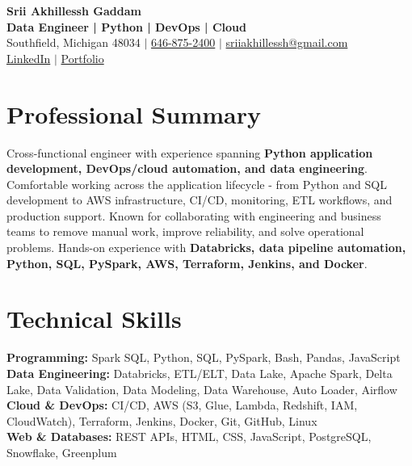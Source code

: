 \documentclass[letterpaper,10pt]{article}
\begin{document}
\fontsize{9.35pt}{10.45pt}\selectfont

\begin{center}
    {\LARGE \textbf{Srii Akhillessh Gaddam}} \\[-1pt]
    \textbf{Data Engineer | Python | DevOps | Cloud} \\[2pt]
    Southfield, Michigan 48034 $|$
    \href{tel:6468752400}{646-875-2400} $|$
    \href{mailto:sriiakhillessh@gmail.com}{sriiakhillessh@gmail.com} \\[1pt]
    \href{https://www.linkedin.com/in/srii-akhiilessh-gaddam-b48668191/}{LinkedIn} $|$
    \href{https://sriiakhillesshg.github.io/portfolio/}{Portfolio}
\end{center}
\vspace{-8pt}

\section{Professional Summary}
\small{Cross-functional engineer with experience spanning \textbf{Python application development, DevOps/cloud automation, and data engineering}. Comfortable working across the application lifecycle - from Python and SQL development to AWS infrastructure, CI/CD, monitoring, ETL workflows, and production support. Known for collaborating with engineering and business teams to remove manual work, improve reliability, and solve operational problems. Hands-on experience with \textbf{Databricks, data pipeline automation, Python, SQL, PySpark, AWS, Terraform, Jenkins, and Docker}.}

\section{Technical Skills}
\small{
\textbf{Programming:} Spark SQL, Python, SQL, PySpark, Bash, Pandas, JavaScript \\
\textbf{Data Engineering:} Databricks, ETL/ELT, Data Lake, Apache Spark, Delta Lake, Data Validation, Data Modeling, Data Warehouse, Auto Loader, Airflow \\
\textbf{Cloud \& DevOps:} CI/CD, AWS (S3, Glue, Lambda, Redshift, IAM, CloudWatch), Terraform, Jenkins, Docker, Git, GitHub, Linux \\
\textbf{Web \& Databases:} REST APIs, HTML, CSS, JavaScript, PostgreSQL, Snowflake, Greenplum
}
\end{document}
